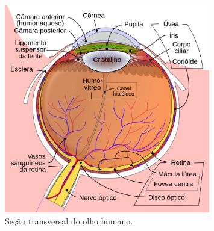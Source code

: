 \documentclass[12pt]{article}
\begin{document}
\begin{figure}[h]
    \centering
    \includegraphics[width=0.8\textwidth]{images/5.png}
    \caption{Seção transversal do olho humano.}
    \label{fig:exemplo}
\end{figure}
\end{document}
